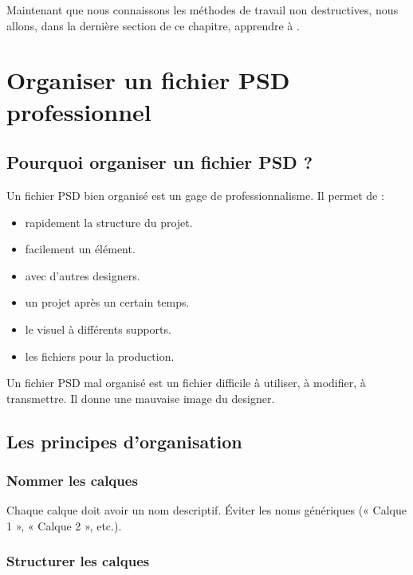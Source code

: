 Maintenant que nous connaissons les méthodes de travail non destructives, nous allons, dans la dernière section de ce chapitre, apprendre à .

\section{Organiser un fichier PSD professionnel}

\subsection{Pourquoi organiser un fichier PSD ?}

Un fichier PSD bien organisé est un gage de professionnalisme. Il permet de :

\begin{itemize}
    \item {} rapidement la structure du projet.
    \item {} facilement un élément.
    \item {} avec d'autres designers.
    \item {} un projet après un certain temps.
    \item {} le visuel à différents supports.
    \item {} les fichiers pour la production.
\end{itemize}

Un fichier PSD mal organisé est un fichier difficile à utiliser, à modifier, à transmettre. Il donne une mauvaise image du designer.

\subsection{Les principes d'organisation}

\subsubsection{Nommer les calques}

Chaque calque doit avoir un nom descriptif. Éviter les noms génériques (« Calque 1 », « Calque 2 », etc.).

\subsubsection{Structurer les calques}

